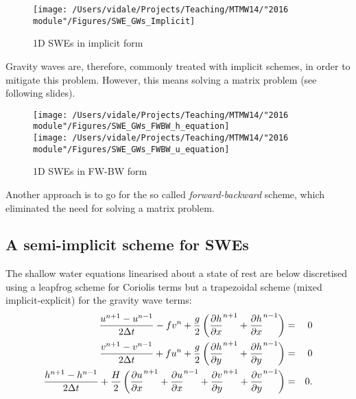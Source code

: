 \begin{figure}
	\texttt{[image: /Users/vidale/Projects/Teaching/MTMW14/"2016 module"/Figures/SWE\_GWs\_Implicit]}
	\label{fig:Spherical}
	\caption{\label{fig:blue_rectangle} \tiny 1D SWEs in implicit form}
\end{figure}

\hfill

\begin{minipage}{0.55\textwidth}
	Gravity waves are, therefore, commonly treated with implicit schemes, in order to mitigate this problem. However, this means solving a matrix problem (see following slides).	
\end{minipage}

\begin{figure}
	\texttt{[image: /Users/vidale/Projects/Teaching/MTMW14/"2016 module"/Figures/SWE\_GWs\_FWBW\_h\_equation]}\\
	\texttt{[image: /Users/vidale/Projects/Teaching/MTMW14/"2016 module"/Figures/SWE\_GWs\_FWBW\_u\_equation]}
	\label{fig:Spherical}
	\caption{\label{fig:blue_rectangle} \tiny 1D SWEs in FW-BW form}
\end{figure}

Another approach is to go for the so called \emph{forward-backward} scheme, which eliminated the need for solving a matrix problem.


\subsection{A semi-implicit scheme for SWEs}

The shallow water equations linearised about a state of rest are below
discretised using a leapfrog scheme for Coriolis terms but a
trapezoidal scheme (mixed implicit-explicit) for the gravity wave
terms:
\begin{eqnarray*}
	\frac{u^{n+1}-u^{n-1}}{2\Delta t}-fv^n+\frac{g}{2}
	\left( \frac{\partial h}{\partial x}^{n+1} +\frac{\partial h}{\partial x}^{n-1} \right) & = & 0 \\
	\frac{v^{n+1}-v^{n-1}}{2\Delta t}+fu^n+\frac{g}{2}
	\left( \frac{\partial h}{\partial y}^{n+1} +\frac{\partial h}{\partial y}^{n-1} \right) & = & 0 \\
	\frac{h^{n+1}-h^{n-1}}{2\Delta t}+\frac{H}{2}
	\left( \frac{\partial u}{\partial x}^{n+1} +\frac{\partial u}{\partial x}^{n-1}
	+\frac{\partial v}{\partial y}^{n+1} +\frac{\partial v}{\partial y}^{n-1} 
	\right) & = & 0. 
\end{eqnarray*}

